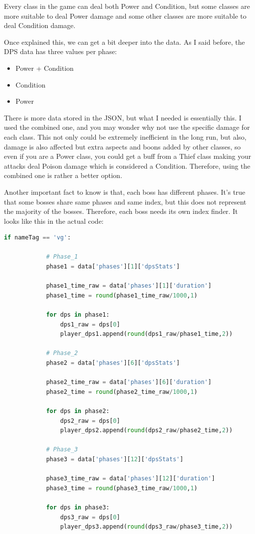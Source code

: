\documentclass[12pt,a4paper]{article}
\begin{document}
    Every class in the game can deal both Power and Condition, but some classes are more suitable to deal Power
    damage and some other classes are more suitable to deal Condition damage.

    Once explained this, we can get a bit deeper into the data. As I said before, the DPS data has three values
    per phase:
    \begin{itemize}
        \item Power + Condition
        \item Condition
        \item Power
    \end{itemize} 

    There is more data stored in the JSON, but what I needed is essentially this. I used the combined one, and
    you may wonder why not use the specific damage for each class. This not only could be extremely inefficient in
    the long run, but also, damage is also affected but extra aspects and boons added by other classes, so even if
    you are a Power class, you could get a buff from a Thief class making your attacks deal Poison damage which is 
    considered a Condition. Therefore, using the combined one is rather a better option.

    \newpage

    Another important fact to know is that, each boss has different phases. It's true that some bosses share same phases
    and same index, but this does not represent the majority of the bosses. Therefore, each boss needs its own index
    finder. It looks like this in the actual code:

    \begin{lstlisting}[language=Python]
    if nameTag == 'vg':

            # Phase_1
            phase1 = data['phases'][1]['dpsStats']

            phase1_time_raw = data['phases'][1]['duration']
            phase1_time = round(phase1_time_raw/1000,1)

            for dps in phase1:
                dps1_raw = dps[0]
                player_dps1.append(round(dps1_raw/phase1_time,2))

            # Phase_2
            phase2 = data['phases'][6]['dpsStats']

            phase2_time_raw = data['phases'][6]['duration']
            phase2_time = round(phase2_time_raw/1000,1)

            for dps in phase2:
                dps2_raw = dps[0]
                player_dps2.append(round(dps2_raw/phase2_time,2))

            # Phase_3
            phase3 = data['phases'][12]['dpsStats']

            phase3_time_raw = data['phases'][12]['duration']
            phase3_time = round(phase3_time_raw/1000,1)

            for dps in phase3:
                dps3_raw = dps[0]
                player_dps3.append(round(dps3_raw/phase3_time,2))
    \end{lstlisting}
\end{document}
